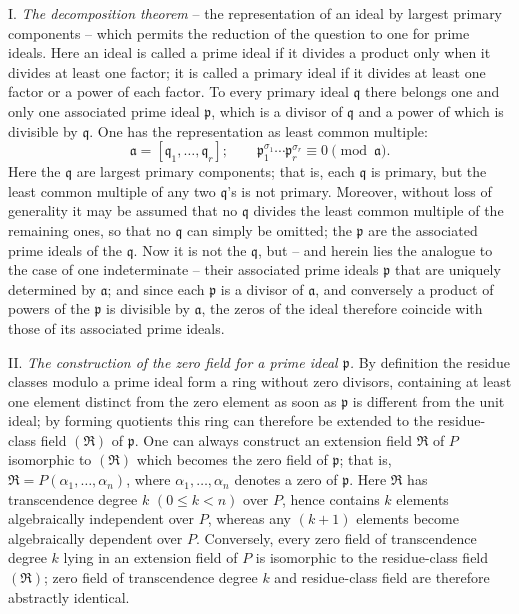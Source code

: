 I. \emph{The decomposition theorem} -- the representation of an ideal by largest primary components -- which permits the reduction of the question to one for prime ideals. Here an ideal is called a prime ideal if it divides a product only when it divides at least one factor; it is called a primary ideal if it divides at least one factor or a power of each factor. To every primary ideal $\mathfrak q$ there belongs one and only one associated prime ideal $\mathfrak p$, which is a divisor of $\mathfrak q$ and a power of which is divisible by $\mathfrak q$. One has the representation as least common multiple:
\[
 \mathfrak a=[\mathfrak q_1,\ldots,\mathfrak q_r];\qquad
 \mathfrak p_1^{\sigma_1}\cdots \mathfrak p_r^{\sigma_r}\equiv 0\pmod{\mathfrak a}.
\]
Here the $\mathfrak q$ are largest primary components; that is, each $\mathfrak q$ is primary, but the least common multiple of any two $\mathfrak q$'s is not primary. Moreover, without loss of generality it may be assumed that no $\mathfrak q$ divides the least common multiple of the remaining ones, so that no $\mathfrak q$ can simply be omitted; the $\mathfrak p$ are the associated prime ideals of the $\mathfrak q$. Now it is not the $\mathfrak q$, but -- and herein lies the analogue to the case of one indeterminate -- their associated prime ideals $\mathfrak p$ that are uniquely determined by $\mathfrak a$; and since each $\mathfrak p$ is a divisor of $\mathfrak a$, and conversely a product of powers of the $\mathfrak p$ is divisible by $\mathfrak a$, the zeros of the ideal therefore coincide with those of its associated prime ideals.

II. \emph{The construction of the zero field for a prime ideal $\mathfrak p$.} By definition the residue classes modulo a prime ideal form a ring without zero divisors, containing at least one element distinct from the zero element as soon as $\mathfrak p$ is different from the unit ideal; by forming quotients this ring can therefore be extended to the residue-class field $(\mathfrak R)$ of $\mathfrak p$. One can always construct an extension field $\mathfrak R$ of $P$ isomorphic to $(\mathfrak R)$ which becomes the zero field of $\mathfrak p$; that is, $\mathfrak R=P(\alpha_1,\ldots,\alpha_n)$, where $\alpha_1,\ldots,\alpha_n$ denotes a zero of $\mathfrak p$. Here $\mathfrak R$ has transcendence degree $k$ $(0\leq k<n)$ over $P$, hence contains $k$ elements algebraically independent over $P$, whereas any $(k+1)$ elements become algebraically dependent over $P$. Conversely, every zero field of transcendence degree $k$ lying in an extension field of $P$ is isomorphic to the residue-class field $(\mathfrak R)$; zero field of transcendence degree $k$ and residue-class field are therefore abstractly identical.

